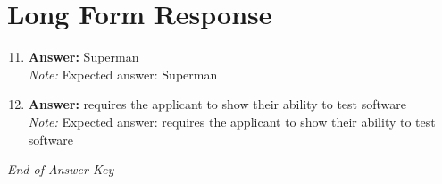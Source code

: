 \documentclass[12pt]{article}
\begin{document}
\section*{Long Form Response}
\begin{enumerate}[label=\arabic*.]
\setcounter{enumi}{10}
\item \textbf{Answer:} Superman
\\ \textit{Note:} Expected answer: Superman
\item \textbf{Answer:} requires the applicant to show their ability to test software
\\ \textit{Note:} Expected answer: requires the applicant to show their ability to test software
\end{enumerate}

\vfill
\noindent\textit{End of Answer Key}
\end{document}
